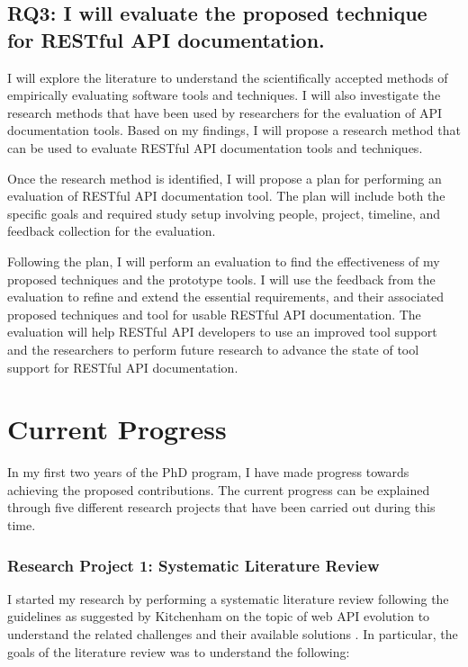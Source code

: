 \documentclass[11pt,oneside]{book}
\begin{document}
\section{RQ3: I will evaluate the proposed technique for RESTful API documentation.}

I will explore the literature to understand the scientifically accepted methods of empirically evaluating software tools and techniques. I will also investigate the research methods that have been used by researchers for the evaluation of API documentation tools. Based on my findings, I will propose a research method that can be used to evaluate RESTful API documentation tools and techniques.

Once the research method is identified, I will propose a plan for performing an evaluation of RESTful API documentation tool. The plan will include both the specific goals and required study setup involving people, project, timeline, and feedback collection for the evaluation.

Following the plan, I will perform an evaluation to find the effectiveness of my proposed techniques and the prototype tools. I will use the feedback from the evaluation to refine and extend the essential requirements, and their associated proposed techniques and tool for usable RESTful API documentation. The evaluation will help RESTful API developers to use an improved tool support and the researchers to perform future research to advance the state of tool support for RESTful API documentation.

\chapter{Current Progress}

In my first two years of the PhD program, I have made progress towards achieving the proposed contributions. The current progress can be explained through five different research projects that have been carried out during this time.
\subsection{Research Project 1: Systematic Literature Review}
I started my research by performing a systematic literature review following the guidelines as suggested by Kitchenham on the topic of web API evolution to understand the related challenges and their available solutions \cite{kitchenham2007guidelines}. In particular, the goals of the literature review was to understand the following:
\end{document}

